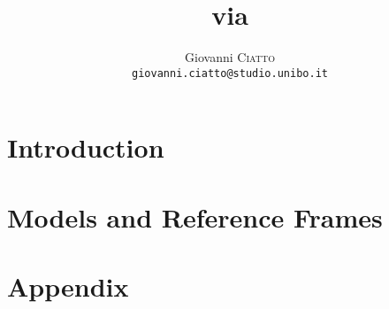 \documentclass[a4paper,12pt]{article}
\title{\textbf{\Slam{} via \Ekf{}}}
\author{
	Giovanni \textsc{Ciatto} \\ \texttt{giovanni.ciatto@studio.unibo.it} \\
}
\begin{document}
	
	\maketitle
	
	\section{Introduction}
		
		
	\section{Models and Reference Frames}
		
		
	\newpage
	\section*{Appendix}
		
	
	\newpage
	{}
	
			
\end{document}
